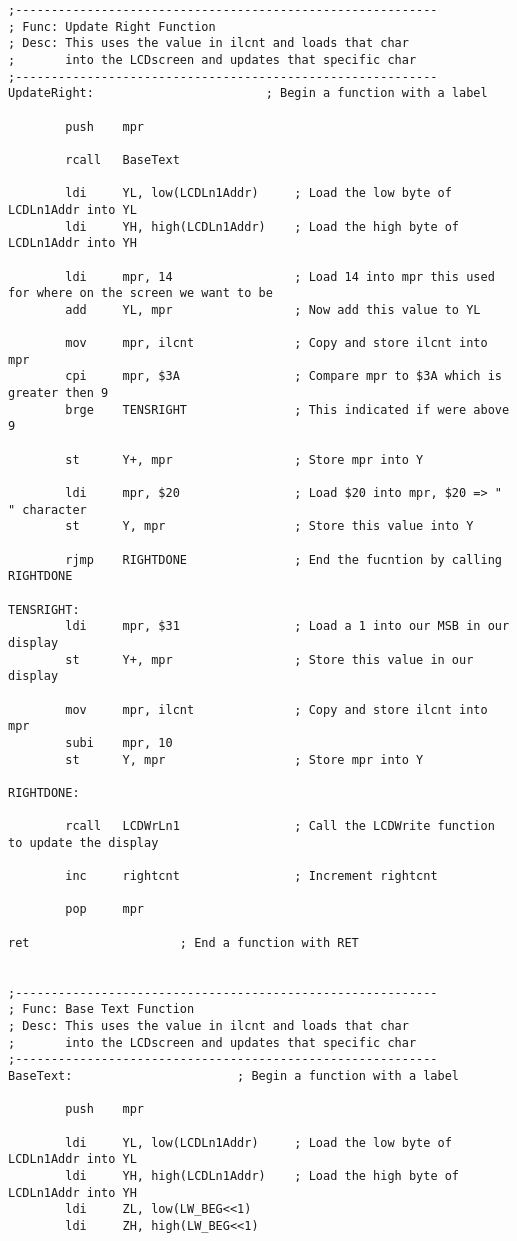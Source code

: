 \documentclass[12pt, letterpaper]{article}
\begin{document}
\begin{verbatim}
;-----------------------------------------------------------
; Func: Update Right Function
; Desc: This uses the value in ilcnt and loads that char
;		into the LCDscreen and updates that specific char
;-----------------------------------------------------------
UpdateRight:						; Begin a function with a label

		push	mpr

		rcall	BaseText

		ldi		YL, low(LCDLn1Addr)		; Load the low byte of LCDLn1Addr into YL
		ldi		YH, high(LCDLn1Addr)	; Load the high byte of LCDLn1Addr into YH

		ldi		mpr, 14					; Load 14 into mpr this used for where on the screen we want to be
		add		YL, mpr					; Now add this value to YL

		mov		mpr, ilcnt				; Copy and store ilcnt into mpr
		cpi		mpr, $3A				; Compare mpr to $3A which is greater then 9			
		brge	TENSRIGHT				; This indicated if were above 9 

		st		Y+, mpr					; Store mpr into Y
		
		ldi		mpr, $20				; Load $20 into mpr, $20 => " " character
		st		Y, mpr					; Store this value into Y

		rjmp	RIGHTDONE				; End the fucntion by calling RIGHTDONE

TENSRIGHT:
		ldi		mpr, $31				; Load a 1 into our MSB in our display
		st		Y+, mpr					; Store this value in our display

		mov		mpr, ilcnt				; Copy and store ilcnt into mpr
		subi	mpr, 10
		st		Y, mpr					; Store mpr into Y

RIGHTDONE:

		rcall	LCDWrLn1				; Call the LCDWrite function to update the display

		inc		rightcnt				; Increment rightcnt

		pop		mpr

ret						; End a function with RET


;-----------------------------------------------------------
; Func: Base Text Function
; Desc: This uses the value in ilcnt and loads that char
;		into the LCDscreen and updates that specific char
;-----------------------------------------------------------
BaseText:						; Begin a function with a label

		push	mpr

		ldi		YL, low(LCDLn1Addr)		; Load the low byte of LCDLn1Addr into YL
		ldi		YH, high(LCDLn1Addr)	; Load the high byte of LCDLn1Addr into YH
		ldi		ZL, low(LW_BEG<<1)
		ldi		ZH, high(LW_BEG<<1)


\end{verbatim}
\end{document}
